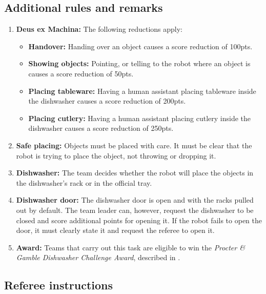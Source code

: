 \subsection*{Additional rules and remarks}
\begin{enumerate}[nosep]
	\item \textbf{Deus ex Machina:} The following reductions apply:
	\begin{itemize}[nosep]
		\item \textbf{Handover:} Handing over an object causes a score reduction of 100pts.
		\item \textbf{Showing objects:} Pointing, or telling to the robot where an object is causes a score reduction of 50pts.
		\item \textbf{Placing tableware:} Having a human assistant placing tableware inside the dishwasher causes a score reduction of 200pts.
		\item \textbf{Placing cutlery:} Having a human assistant placing cutlery inside the dishwasher causes a score reduction of 250pts.
	\end{itemize}

	\item \textbf{Safe placing:} Objects must be placed with care. It must be clear that the robot is trying to place the object, not throwing or dropping it.

	\item \textbf{Dishwasher:} The team decides whether the robot will place the objects in the dishwasher's rack or in the official tray.

	\item \textbf{Dishwasher door:} The dishwasher door is open and with the racks pulled out by default.
	The team leader can, however, request the dishwasher to be closed and score additional points for opening it. If the robot fails to open the door, it must clearly state it and request the referee to open it.

	\item \textbf{Award:} Teams that carry out this task are eligible to win the \textit{Procter \& Gamble Dishwasher Challenge Award}, described in .

\end{enumerate}

\subsection*{Referee instructions}

